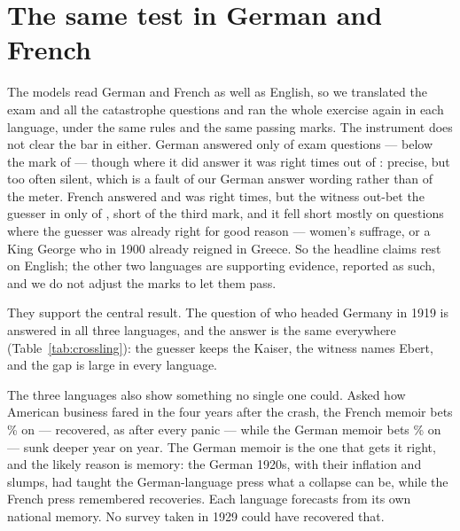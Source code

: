 \documentclass[11pt]{article}
\begin{document}
\section{The same test in German and French}\label{sec:languages}

The models read German and French as well as English, so we translated the exam and all the catastrophe
questions and ran the whole exercise again in each language, under the same rules and the same passing
marks. The instrument does not clear the bar in either. German answered only \NDEexamAnswered{} of
\NexamTotal{} exam questions --- below the mark of \NbarAnswer{} --- though where it did answer it was right
\NDEexamCorrect{} times out of \NDEexamAnswered{}: precise, but too often silent, which is a fault of our
German answer wording rather than of the meter. French answered \NFRexamAnswered{} and was right
\NFRexamCorrect{} times, but the witness out-bet the guesser in only \NFRexamOutbet{} of \NFRexamAnswered{},
short of the third mark, and it fell short mostly on questions where the guesser was already right for good
reason --- women's suffrage, or a King George who in 1900 already reigned in Greece. So the headline claims
rest on English; the other two languages are supporting evidence, reported as such, and we do not adjust the
marks to let them pass.

They support the central result. The question of who headed Germany in 1919 is answered in all three
languages, and the answer is the same everywhere (Table~\ref{tab:crossling}): the guesser keeps the Kaiser,
the witness names Ebert, and the gap is large in every language.

\begin{table}[t]\centering\small

\caption{The flagship question in three languages. The guesser's bet on the republic, the witness's bet, and
the gap in nats. The guesser keeps a monarch in every language; the gap is the German republic's distance
from the pre-war picture, and it is large everywhere.}
\label{tab:crossling}
\end{table}

The three languages also show something no single one could. Asked how American business fared in the four
years after the crash, the French memoir bets \NdepFRp\% on \emph{\NdepFRbets} --- recovered, as after every
panic --- while the German memoir bets \NdepDEp\% on \emph{\NdepDEbets} --- sunk deeper year on year. The
German memoir is the one that gets it right, and the likely reason is memory: the German 1920s, with their
inflation and slumps, had taught the German-language press what a collapse can be, while the French press
remembered recoveries. Each language forecasts from its own national memory. No survey taken in 1929 could
have recovered that.
\end{document}
